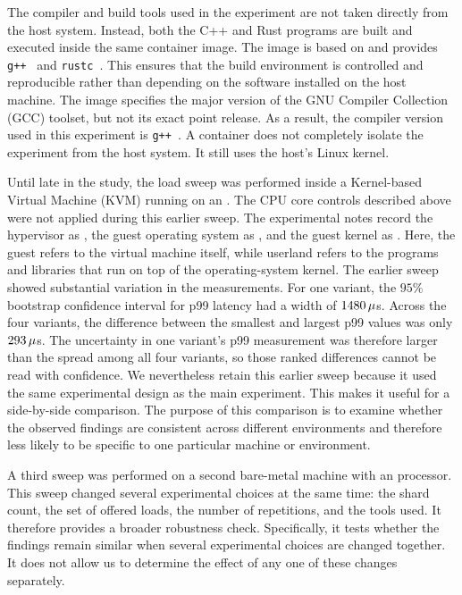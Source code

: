 \documentclass[english,oneside,a4paper,censored,csm,software-track-2020]{HYthesisML}
\begin{document}
The compiler and build tools used in the experiment are not taken directly
from the host system. Instead, both the C++ and Rust programs are built and
executed inside the same container image. The image is based on \MainDistro{}
and provides \texttt{g++~\MainGpp} and \texttt{rustc~\MainRustc}. This
ensures that the build environment is controlled and reproducible rather
than depending on the software installed on the host machine. The image specifies the major
version of the GNU Compiler Collection (GCC) toolset, but not its exact point release. As a
result, the compiler version used in this experiment is \texttt{g++~\MainGpp}. A container
does not completely isolate the experiment from the host system. It still uses the host's
Linux kernel.

Until late in the study, the load sweep was performed inside a
Kernel-based Virtual Machine (KVM) running on an \GuestCpu{}. The CPU core
controls described above were not applied during this earlier sweep. The
experimental notes record the hypervisor as \GuestVirt{}, the guest
operating system as \GuestDistro{}, and the guest kernel as \GuestKernel{}.
Here, the guest refers to the virtual machine itself, while userland refers
to the programs and libraries that run on top of the operating-system
kernel. The earlier sweep showed substantial variation in the measurements. For one
variant, the $95\%$ bootstrap confidence interval for p99 latency had a
width of $1480\,\mu$s. Across the four variants, the
difference between the smallest and largest p99 values was only
$293\,\mu$s. The uncertainty in one variant's p99 measurement was
therefore larger than the spread among all four variants, so those ranked differences
cannot be read with confidence. We nevertheless retain this earlier sweep because it used the same
experimental design as the main experiment. This makes it useful for a
side-by-side comparison. The purpose of this comparison is to examine
whether the observed findings are consistent across different environments
and therefore less likely to be specific to one particular machine or
environment.

A third sweep was performed on a second bare-metal machine with an
\BmCpu{} processor. This sweep changed several experimental choices at
the same time: the shard count, the set of offered loads, the number of
repetitions, and the tools used. It therefore provides a broader
robustness check. Specifically, it tests whether the findings remain
similar when several experimental choices are changed together. It does
not allow us to determine the effect of any one of these changes
separately.
\end{document}
